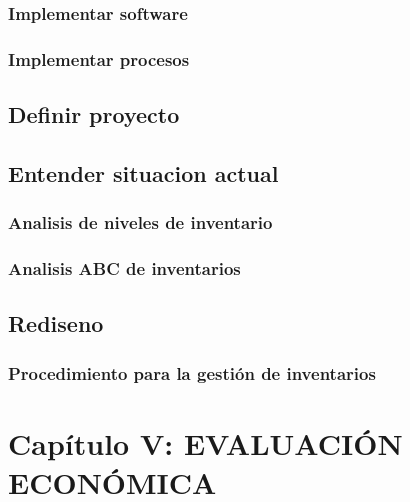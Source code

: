 \documentclass[
]{article}
\begin{document}
\hypertarget{implementar-software-1}{%
\subsubsection{Implementar software}\label{implementar-software-1}}

\hypertarget{implementar-procesos-1}{%
\subsubsection{Implementar procesos}\label{implementar-procesos-1}}

\hypertarget{definir-proyecto-2}{%
\subsection{Definir proyecto}\label{definir-proyecto-2}}

\hypertarget{entender-situacion-actual}{%
\subsection{Entender situacion actual}\label{entender-situacion-actual}}

\hypertarget{analisis-de-niveles-de-inventario-1}{%
\subsubsection{Analisis de niveles de
inventario}\label{analisis-de-niveles-de-inventario-1}}

\hypertarget{analisis-abc-de-inventarios-1}{%
\subsubsection{Analisis ABC de
inventarios}\label{analisis-abc-de-inventarios-1}}

\hypertarget{rediseno}{%
\subsection{Rediseno}\label{rediseno}}

\hypertarget{procedimiento-para-la-gestiuxf3n-de-inventarios}{%
\subsubsection{Procedimiento para la gestión de
inventarios}\label{procedimiento-para-la-gestiuxf3n-de-inventarios}}

\hypertarget{capuxedtulo-v-evaluaciuxf3n-econuxf3mica}{%
\section{Capítulo V: EVALUACIÓN
ECONÓMICA}\label{capuxedtulo-v-evaluaciuxf3n-econuxf3mica}}
\end{document}

